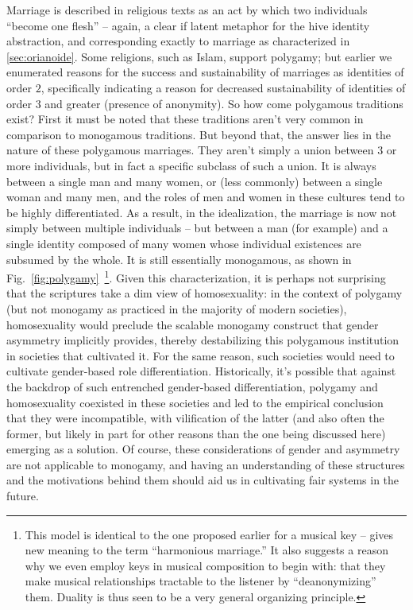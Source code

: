 \documentclass[pra,twocolumn,groupedaddress,10pt]{revtex4}
\theoremstyle{definition}
\begin{document}
Marriage is described in religious texts as an act by which two individuals ``become one flesh''\cite{torahmarriage}\cite{biblemarriage} -- again, a clear if latent metaphor for the hive identity abstraction, and corresponding exactly to marriage as characterized in \autoref{sec:orianoide}. Some religions, such as Islam\cite{quranmarriage}, support polygamy; but earlier we enumerated reasons for the success and sustainability of marriages as identities of order $2$, specifically indicating a reason for decreased sustainability of identities of order $3$ and greater (presence of anonymity). So how come polygamous traditions exist? First it must be noted that these traditions aren't very common in comparison to monogamous traditions. But beyond that, the answer lies in the nature of these polygamous marriages. They aren't simply a union between $3$ or more individuals, but in fact a specific subclass of such a union. It is always between a single man and many women, or (less commonly) between a single woman and many men, and the roles of men and women in these cultures tend to be highly differentiated. As a result, in the idealization, the marriage is now not simply between multiple individuals -- but between a man (for example) and a single identity composed of many women whose individual existences are subsumed by the whole. It is still essentially monogamous, as shown in Fig.~\ref{fig:polygamy}~\footnote{This model is identical to the one proposed earlier for a musical key -- gives new meaning to the term ``harmonious marriage.'' It also suggests a reason why we even employ keys in musical composition to begin with: that they make musical relationships tractable to the listener by ``deanonymizing'' them. Duality is thus seen to be a very general organizing principle.}. Given this characterization, it is perhaps not surprising that the scriptures take a dim view of homosexuality: in the context of polygamy (but not monogamy as practiced in the majority of modern societies), homosexuality would preclude the scalable monogamy construct that gender asymmetry implicitly provides, thereby destabilizing this polygamous institution in societies that cultivated it. For the same reason, such societies would need to cultivate gender-based role differentiation. Historically, it's possible that against the backdrop of such entrenched gender-based differentiation, polygamy and homosexuality coexisted in these societies and led to the empirical conclusion that they were incompatible, with vilification of the latter (and also often the former, but likely in part for other reasons than the one being discussed here) emerging as a solution. Of course, these considerations of gender and asymmetry are not applicable to monogamy, and having an understanding of these structures and the motivations behind them should aid us in cultivating fair systems in the future.
\end{document}
